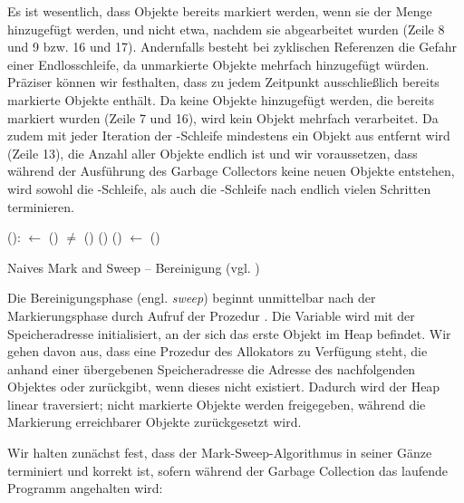 Es ist wesentlich, dass Objekte bereits markiert werden, wenn sie der Menge  hinzugefügt werden, und nicht etwa, nachdem sie abgearbeitet wurden (Zeile 8 und 9 bzw. 16 und 17).
Andernfalls besteht bei zyklischen Referenzen die Gefahr einer Endlosschleife, da unmarkierte Objekte mehrfach hinzugefügt würden.
Präziser können wir festhalten, dass  zu jedem Zeitpunkt ausschließlich bereits markierte Objekte enthält.
Da keine Objekte hinzugefügt werden, die bereits markiert wurden (Zeile 7 und 16), wird kein Objekt mehrfach verarbeitet.
Da zudem mit jeder Iteration der \WHILE-Schleife mindestens ein Objekt aus  entfernt wird (Zeile 13), die Anzahl aller Objekte endlich ist und wir voraussetzen, dass während der Ausführung des Garbage Collectors keine neuen Objekte entstehen, wird sowohl die \WHILE-Schleife, als auch die \FOREACH-Schleife nach endlich vielen Schritten terminieren.

\begin{algorithm}
\begin{algorithmic}[1]
	\State {}():
	\State \quad {} $\gets$ ()
	\State \quad \WHILE {} $\neq$ \Null
	\State \quad \quad \IF {}()
	\State \quad \quad \quad {}()
	\State \quad \quad \ELSE {}()
	\State \quad \quad {} $\gets$ ()
\end{algorithmic}
\caption[Naives Mark and Sweep -- Bereinigung]{Naives Mark and Sweep -- Bereinigung (vgl. \cite[Kap. 2.2]{jones-lins})}
\label{algo:naive-sweep}
\end{algorithm}

Die Bereinigungsphase (engl. \textit{sweep}) beginnt unmittelbar nach der Markierungsphase durch Aufruf der Prozedur .
Die Variable  wird mit der Speicheradresse initialisiert, an der sich das erste Objekt im Heap befindet.
Wir gehen davon aus, dass eine Prozedur  des Allokators zu Verfügung steht, die anhand einer übergebenen Speicheradresse die Adresse des nachfolgenden Objektes oder \Null zurückgibt, wenn dieses nicht existiert.
Dadurch wird der Heap linear traversiert; nicht markierte Objekte werden freigegeben, während die Markierung erreichbarer Objekte zurückgesetzt wird.

Wir halten zunächst fest, dass der Mark-Sweep-Algorithmus in seiner Gänze terminiert und korrekt ist, sofern während der Garbage Collection das laufende Programm angehalten wird:

